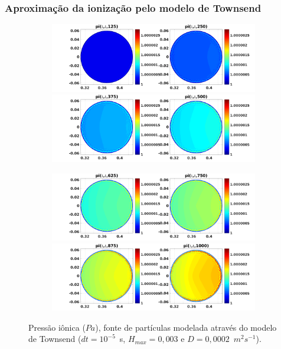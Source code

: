 \documentclass[aspectratio=169]{beamer}
\begin{document}
\begin{frame}		
\frametitle{Aproximação da ionização pelo modelo de Townsend}
\begin{figure}[H]
\begin{subfigure}{0.43\textwidth}
\includegraphics[scale=0.24]{../SImulacao_breakdown/PDE/pitod1B2.png}  
\includegraphics[scale=0.24]{../SImulacao_breakdown/PDE/pitod2B2.png} 
\end{subfigure}
\begin{subfigure}{0.43\textwidth}
\includegraphics[scale=0.24]{../SImulacao_breakdown/PDE/pitod3B2.png} 
\includegraphics[scale=0.24]{../SImulacao_breakdown/PDE/pitod4B2.png} 
\end{subfigure}	
\caption{Pressão iônica ($Pa$), fonte de partículas modelada através do modelo de Townsend ($dt=10^{-5}$\ s, $H_{max} = 0,003$ e $D=0,0002$\ $m^2s^{-1}$).}
\end{figure}
\end{frame}
\end{document}
